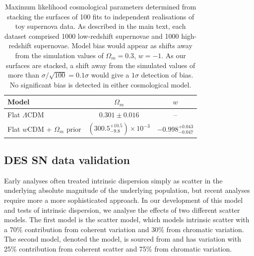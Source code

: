 \documentclass[a4paper,fleqn,usenatbib]{mnras}
\newcommand{\gten}{\citetalias{Guy2010}}
\newcommand{\celeven}{\citetalias{Chotard2011}}
\begin{document}
\begin{table}
	\centering
	\caption{Maximum likelihood cosmological parameters determined from stacking the surfaces of 100 fits to independent realisations of toy supernova data. As described in the main text, each dataset comprised 1000 low-redshift supernovae and 1000 high-redshift supernovae. Model bias would appear as shifts away from the simulation values of $\Omega_m = 0.3$, $w = -1$. As our surfaces are stacked, a shift away from the simulated values of more than $\sigma/\sqrt{100} = 0.1\sigma$ would give a $1\sigma$ detection of bias. No significant bias is detected in either cosmological model.}
	\label{tab:simple_model}
	\begin{tabular}{l|cc}
		\hline
		Model & $\Omega_m$ & $w$ \\ 
		\hline
		Flat $\Lambda$CDM & $0.301\pm 0.016$ & -- \\ 
		Flat $w$CDM + $\Omega_m$ prior & $\left( 300.5^{+10.5}_{-9.8} \right) \times 10^{-3}$ & $-0.998^{+0.043}_{-0.047}$ \\ 
		\hline
	\end{tabular}
\end{table}




















\subsection{DES SN data validation}
\label{sec:simdes}


Early analyses often treated intrinsic dispersion simply as scatter in the underlying absolute magnitude of the underlying population, but recent analyses require more a more sophisticated approach. In our development of this model and tests of intrinsic dispersion, we analyse the effects of two different scatter models. The first model is the \citet[][hereafter denoted {\gten}]{Guy2010} scatter model, which models intrinsic scatter with a 70\% contribution from coherent variation and 30\% from chromatic variation. The second model, denoted the {\celeven} model, is sourced from \citet{Chotard2011} and has variation with 25\% contribution from coherent scatter and 75\% from chromatic variation. 
\end{document}
